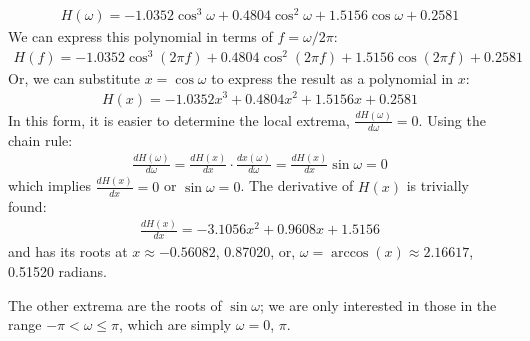 \begin{align}
    H(\omega) = -1.0352\cos^3\omega + 0.4804\cos^2\omega + 1.5156\cos\omega + 0.2581
\end{align}
We can express this polynomial in terms of $f=\omega/2\pi$:
\begin{align}
    H(f) = -1.0352\cos^3(2\pi f) + 0.4804\cos^2(2\pi f) + 1.5156\cos(2\pi f) + 0.2581
\end{align}
Or, we can substitute $x=\cos\omega$ to express the result as a polynomial in $x$:
\begin{align}
    H(x) = -1.0352x^3 + 0.4804x^2+ 1.5156x + 0.2581
\end{align}
In this form, it is easier to determine the local extrema, $\frac{dH(\omega)}{d\omega}=0$. Using the chain rule:
\begin{align}
    \frac{dH(\omega)}{d\omega} = \frac{dH(x)}{dx} \cdot \frac{dx(\omega)}{d\omega} = \frac{dH(x)}{dx} \sin\omega = 0
\end{align}
which implies $\frac{dH(x)}{dx}=0$ or $\sin\omega=0$. The derivative of $H(x)$ is trivially found:
\begin{align}
    \frac{dH(x)}{dx} = -3.1056 x^2 + 0.9608 x + 1.5156
\end{align}
and has its roots at $x\approx-0.56082$, 0.87020, or, $\omega=\arccos(x)\approx2.16617$, 0.51520 radians.

\newpage

The other extrema are the roots of $\sin\omega$; we are only interested in those in the range $-\pi<\omega\leq\pi$, which are simply $\omega=0$, $\pi$.

